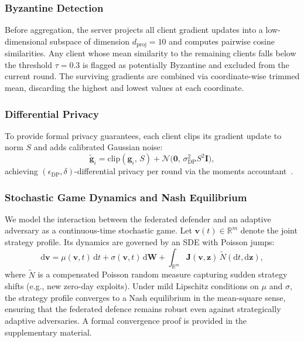 \documentclass[journal,twoside]{IEEEtran}
\begin{document}
\subsubsection{Byzantine Detection}
Before aggregation, the server projects all client gradient updates into
a low-dimensional subspace of dimension $d_{\mathrm{proj}}=10$ and
computes pairwise cosine similarities.  Any client whose mean similarity
to the remaining clients falls below the threshold $\tau=0.3$ is flagged
as potentially Byzantine and excluded from the current round.  The
surviving gradients are combined via coordinate-wise trimmed mean,
discarding the highest and lowest values at each coordinate.

\subsubsection{Differential Privacy}
To provide formal privacy guarantees, each client clips its gradient
update to norm $S$ and adds calibrated Gaussian noise:
\begin{equation}
  \tilde{\mathbf{g}}_i
  = \mathrm{clip}(\mathbf{g}_i,\,S)
    + \mathcal{N}\!\bigl(\mathbf{0},\,\sigma_{\mathrm{DP}}^2 S^2
    \mathbf{I}\bigr),
  \label{eq:dp}
\end{equation}
achieving $(\epsilon_{\mathrm{DP}},\delta)$-differential privacy per
round via the moments accountant~\cite{abadi2016deep}.

\subsubsection{Stochastic Game Dynamics and Nash Equilibrium}
We model the interaction between the federated defender and an adaptive
adversary as a continuous-time stochastic game.  Let
$\mathbf{v}(t)\in\mathbb{R}^{m}$ denote the joint strategy profile.
Its dynamics are governed by an SDE with Poisson jumps:
\begin{equation}
  \mathrm{d}\mathbf{v}
  = \mu(\mathbf{v},t)\,\mathrm{d}t
    + \sigma(\mathbf{v},t)\,\mathrm{d}\mathbf{W}
    + \int_{\mathbb{R}^m}\!\mathbf{J}(\mathbf{v},\mathbf{z})\,
      \widetilde{N}(\mathrm{d}t,\mathrm{d}\mathbf{z}),
  \label{eq:jump_sde}
\end{equation}
where $\widetilde{N}$ is a compensated Poisson random measure capturing
sudden strategy shifts (e.g., new zero-day exploits).  Under mild
Lipschitz conditions on $\mu$ and $\sigma$, the strategy profile
converges to a Nash equilibrium in the mean-square sense, ensuring that
the federated defence remains robust even against strategically adaptive
adversaries.  A formal convergence proof is provided in the
supplementary material.
\end{document}
